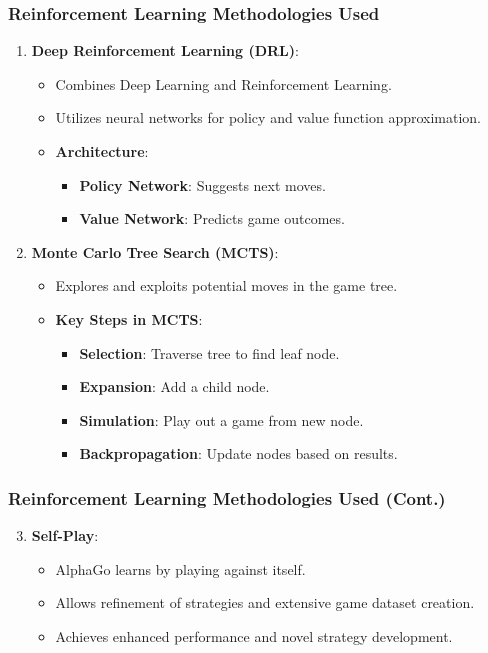 \documentclass[aspectratio=169]{beamer}
\begin{document}
\begin{frame}[fragile]
  \frametitle{Reinforcement Learning Methodologies Used}
  \begin{enumerate}
    \item \textbf{Deep Reinforcement Learning (DRL)}:
      \begin{itemize}
        \item Combines Deep Learning and Reinforcement Learning.
        \item Utilizes neural networks for policy and value function approximation.
        \item \textbf{Architecture}: 
        \begin{itemize}
          \item \textbf{Policy Network}: Suggests next moves.
          \item \textbf{Value Network}: Predicts game outcomes.
        \end{itemize}
      \end{itemize}
      
    \item \textbf{Monte Carlo Tree Search (MCTS)}:
      \begin{itemize}
        \item Explores and exploits potential moves in the game tree.
        \item \textbf{Key Steps in MCTS}:
        \begin{itemize}
          \item \textbf{Selection}: Traverse tree to find leaf node.
          \item \textbf{Expansion}: Add a child node.
          \item \textbf{Simulation}: Play out a game from new node.
          \item \textbf{Backpropagation}: Update nodes based on results.
        \end{itemize}
      \end{itemize}
  \end{enumerate}
\end{frame}

\begin{frame}[fragile]
  \frametitle{Reinforcement Learning Methodologies Used (Cont.)}
  \begin{enumerate}\setcounter{enumi}{2}
    \item \textbf{Self-Play}:
      \begin{itemize}
        \item AlphaGo learns by playing against itself.
        \item Allows refinement of strategies and extensive game dataset creation.
        \item Achieves enhanced performance and novel strategy development.
      \end{itemize}
  \end{enumerate}
\end{frame}
\end{document}

